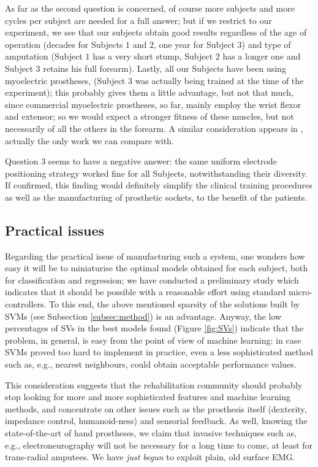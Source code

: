 As far as the second question is concerned, of course more subjects and more cycles per
subject are needed for a full answer; but if we restrict to our experiment, we see that
our subjects obtain good results regardless of the age of operation (decades for Subjects
$1$ and $2$, one year for Subject $3$) and type of amputation (Subject $1$ has a very
short stump, Subject $2$ has a longer one and Subject $3$ retains his full forearm).
Lastly, all our Subjects have been using myoelectric prostheses, (Subject $3$
was actually being trained at the time of the experiment); this probably gives them
a little advantage, but not that much, since commercial myoelectric prostheses, so far,
mainly employ the wrist flexor and extensor; so we would expect a stronger fitness of
these muscles, but not necessarily of all the others in the forearm. A similar consideration
appears in \cite{sebelius}, actually the only work we can compare with.

Question $3$ seems to have a negative answer: the same uniform electrode positioning strategy
worked fine for all Subjects, notwithstanding their diversity.
If confirmed, this finding would definitely simplify the clinical training procedures as well
as the manufacturing of prosthetic sockets, to the benefit of the patients.

\subsection{Practical issues}

Regarding the practical issue of manufacturing such a system,
one wonders how easy it will be to miniaturise the optimal
models obtained for each subject, both for classification and regression;
we have conducted a preliminary study which indicates that it should be possible
with a reasonable effort using standard micro-controllers. To this end, the
above mentioned sparsity of the solutions built by SVMs (see Subsection
\ref{subsec:method}) is an advantage. Anyway, the low percentages of SVs in the
best models found (Figure \ref{fig:SVs}) indicate that the problem, in general,
is easy from the point of view of machine learning: in case SVMs proved too
hard to implement in practice, even a less sophisticated method such as, e.g.,
nearest neighbours, could obtain acceptable performance values.

This consideration suggests that the rehabilitation community should probably stop
looking for more and more sophisticated features and machine learning methods,
and concentrate on other issues such as the prosthesis itself (dexterity, impedance
control, humanoid-ness) and sensorial feedback. As well, knowing the state-of-the-art of
hand prostheses, we claim that invasive techniques such as, e.g., electroneurography
\cite{cipriani} will not be necessary for a long time to come, at least for
trans-radial amputees. We have \emph{just begun} to exploit plain, old surface EMG.

